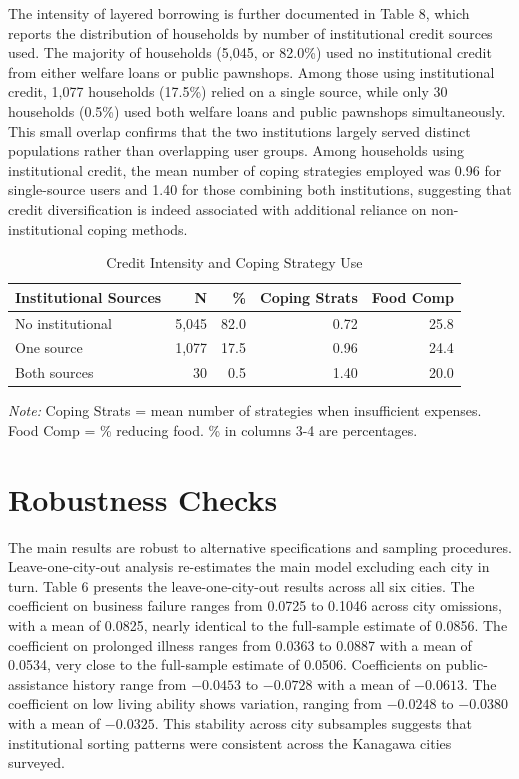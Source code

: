 \documentclass[12pt,a4paper]{article}
\begin{document}
The intensity of layered borrowing is further documented in Table 8, which reports the distribution of households by number of institutional credit sources used. The majority of households (5,045, or 82.0\%) used no institutional credit from either welfare loans or public pawnshops. Among those using institutional credit, 1,077 households (17.5\%) relied on a single source, while only 30 households (0.5\%) used both welfare loans and public pawnshops simultaneously. This small overlap confirms that the two institutions largely served distinct populations rather than overlapping user groups. Among households using institutional credit, the mean number of coping strategies employed was 0.96 for single-source users and 1.40 for those combining both institutions, suggesting that credit diversification is indeed associated with additional reliance on non-institutional coping methods.

\begin{table}[!h]
\centering
\small
\caption{Credit Intensity and Coping Strategy Use}
\label{tab:intensity}
\begin{tabular}{lrrrr}
\toprule
Institutional Sources & N & \% & Coping Strats & Food Comp \\
\midrule
No institutional & 5,045 & 82.0 & 0.72 & 25.8 \\
One source & 1,077 & 17.5 & 0.96 & 24.4 \\
Both sources & 30 & 0.5 & 1.40 & 20.0 \\
\bottomrule
\end{tabular}

\noindent\small\emph{Note:} Coping Strats = mean number of strategies when insufficient expenses. Food Comp = \% reducing food. \% in columns 3-4 are percentages.
\end{table}

\section{Robustness Checks}

The main results are robust to alternative specifications and sampling procedures. Leave-one-city-out analysis re-estimates the main model excluding each city in turn. Table 6 presents the leave-one-city-out results across all six cities. The coefficient on business failure ranges from 0.0725 to 0.1046 across city omissions, with a mean of 0.0825, nearly identical to the full-sample estimate of 0.0856. The coefficient on prolonged illness ranges from 0.0363 to 0.0887 with a mean of 0.0534, very close to the full-sample estimate of 0.0506. Coefficients on public-assistance history range from $-0.0453$ to $-0.0728$ with a mean of $-0.0613$. The coefficient on low living ability shows variation, ranging from $-0.0248$ to $-0.0380$ with a mean of $-0.0325$. This stability across city subsamples suggests that institutional sorting patterns were consistent across the Kanagawa cities surveyed.
\end{document}
